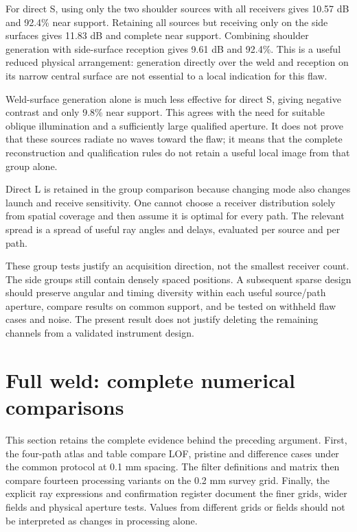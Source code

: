 \documentclass[11pt]{article}
\begin{document}
For direct S, using only the two shoulder sources with all receivers gives 10.57 dB and 92.4\% near support. Retaining all sources but receiving only on the side surfaces gives 11.83 dB and complete near support. Combining shoulder generation with side-surface reception gives 9.61 dB and 92.4\%. This is a useful reduced physical arrangement: generation directly over the weld and reception on its narrow central surface are not essential to a local indication for this flaw.

Weld-surface generation alone is much less effective for direct S, giving negative contrast and only 9.8\% near support. This agrees with the need for suitable oblique illumination and a sufficiently large qualified aperture. It does not prove that these sources radiate no waves toward the flaw; it means that the complete reconstruction and qualification rules do not retain a useful local image from that group alone.

Direct L is retained in the group comparison because changing mode also changes launch and receive sensitivity. One cannot choose a receiver distribution solely from spatial coverage and then assume it is optimal for every path. The relevant spread is a spread of useful ray angles and delays, evaluated per source and per path.

These group tests justify an acquisition direction, not the smallest receiver count. The side groups still contain densely spaced positions. A subsequent sparse design should preserve angular and timing diversity within each useful source/path aperture, compare results on common support, and be tested on withheld flaw cases and noise. The present result does not justify deleting the remaining channels from a validated instrument design.


\section{Full weld: complete numerical comparisons}

\label{saft:archive:full:complete}
This section retains the complete evidence behind the preceding argument. First, the four-path atlas and table compare LOF, pristine and difference cases under the common protocol at 0.1 mm spacing. The filter definitions and matrix then compare fourteen processing variants on the 0.2 mm survey grid. Finally, the explicit ray expressions and confirmation register document the finer grids, wider fields and physical aperture tests. Values from different grids or fields should not be interpreted as changes in processing alone.
\end{document}
